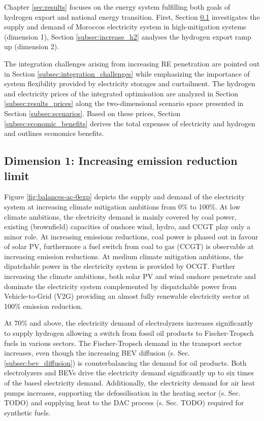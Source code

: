 Chapter \ref{sec:results} focuses on the energy system fulfilling both goals of hydrogen export and national energy transition. First, Section \ref{subsec:increase_limit} investigates the supply and demand of Moroccos electricity system in high-mitigation systems (dimension 1), Section \ref{subsec:increase_h2} analyses the hydrogen export ramp up (dimension 2).

The integration challenges arising from increasing RE penetration are pointed out in Section \ref{subsec:integration_challenges} while emphasizing the importance of system flexibility provided by electricity storages and curtailment. The hydrogen and electricity prices of the integrated optimisation are analyzed in Section \ref{subsec:results_prices} along the two-dimensional scenario space presented in Section \ref{subsec:scenarios}. Based on these prices, Section \ref{subsec:economic_benefits} derives the total expenses of electricity and hydrogen and outlines economics benefits. 

\label{subsec:supply}
\label{subsec:integration_challenges}
\label{subsec:results_prices}
\label{subsec:economic_benefits}
\label{subsec:sensitivity}

\subsection{Dimension 1: Increasing emission reduction limit}
\label{subsec:increase_limit}
Figure \ref{fig:balances-ac-0exp} depicts the supply and demand of the electricity system at increasing climate mitigation ambitions from 0\% to 100\%. At low climate ambitions, the electricity demand is mainly covered by coal power, existing (brownfield) capacities of onshore wind, hydro, and CCGT play only a minor role. 
At increasing emissions reductions, coal power is phased out in favour of solar PV, furthermore a fuel switch from coal to gas (CCGT) is observable at increasing emission reductions. At medium climate mitigation ambitions, the dipatchable power in the electricity system is provided by OCGT. 
Further increasing the climate ambitions, both solar PV and wind onshore penetrate and dominate the electricity system complemented by dispatchable power from Vehicle-to-Grid (V2G) providing an almost fully renewable electricity sector at 100\% emission reduction. 

At 70\% and above, the electricity demand of electrolyzers increases significantly to supply hydrogen allowing a switch from fossil oil products to Fischer-Tropsch fuels in various sectors. The Fischer-Tropsch demand in the transport sector increases, even though the increasing BEV diffusion (s. Sec. \ref{subsec:bev_diffusion}) is counterbalancing the demand for oil products. 
Both electrolyzers and BEVs drive the electricity demand significantly up to six times of the based electricity demand. 
Additionally, the electricity demand for air heat pumps increases, supporting the defossilisation in the heating sector (s. Sec. TODO) and supplying heat to the DAC process (s. Sec. TODO) required for synthetic fuels.


